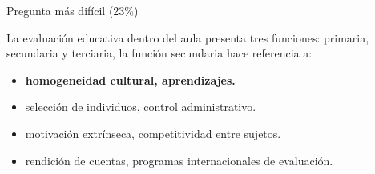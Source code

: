 \documentclass[11pt, aspectratio=169, xcolor=table,hyphens]{beamer}
\begin{document}
    \begin{frame}{Pregunta más difícil (23\%)}

      La evaluación educativa dentro del aula presenta tres funciones: primaria, secundaria y terciaria, la función secundaria hace referencia a:
      \begin{itemize}
        \item[A)] \textbf<2->{homogeneidad cultural, aprendizajes. }
        \item[B)] selección de individuos, control administrativo.
        \item[C)] motivación extrínseca, competitividad entre sujetos.
        \item[D)] rendición de cuentas, programas internacionales de evaluación.
      \end{itemize}

    \end{frame}
\end{document}
